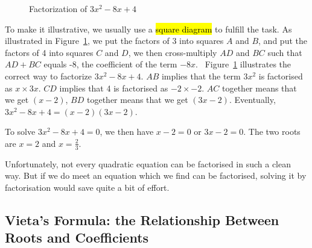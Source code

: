 \documentclass[11pt, oneside]{article}   	%
\begin{document}
\begin{figure}
\centering 
{}
\caption{Factorization of $3x^2 - 8x + 4$}
\label{fig:factorization}
\end{figure}


To make it illustrative, we usually use a \hl{square diagram} to fulfill the task.  As illustrated in Figure~\ref{fig:factorization}, we put the factors of 3 into squares $A$ and $B$, and put the factors of 4 into squares $C$ and $D$, we then cross-multiply $AD$ and $BC$ such that $AD + BC$ equals -8, the coefficient of the term $-8x$.  Figure~\ref{fig:factorization} illustrates the correct way to factorize $3x^2 -8x +4$. $AB$ implies that the term $3x^2$ is factorised as $x \times 3x$. $CD$ implies that 4 is factorised as $-2 \times -2$. $AC$ together means that we get $(x-2)$, $BD$ together means that we get $(3x-2)$. Eventually, $3x^2 - 8x +4 = (x-2)(3x-2)$. 

To solve $3x^2 - 8x +4=0$, we then have $x-2=0$ or $3x-2=0$. The two roots are $x=2$ and $x=\frac{2}{3}$. 

Unfortunately, not every quadratic equation can be factorised in such a clean way. But if we do meet an equation which we find can be factorised, solving it by factorisation would save quite a bit of effort. 


\subsection{Vieta's Formula: the Relationship Between Roots and Coefficients}
\end{document}
